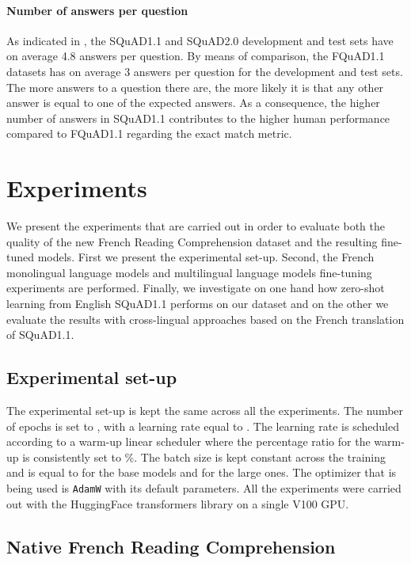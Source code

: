 \documentclass{article}
\begin{document}
\paragraph{Number of answers per question}{
As indicated in \citep{rajpurkar-squad-v2}, the SQuAD1.1 and SQuAD2.0 development and test sets have on average 4.8 answers per question.
By means of comparison, the FQuAD1.1 datasets has on average 3 answers per question for the development and test sets.
The more answers to a question there are, the more likely it is that any other answer is equal to one of the expected answers. 
As a consequence, the higher number of answers in SQuAD1.1 contributes to the higher human performance compared to FQuAD1.1 regarding the exact match metric.
}
 
\section{Experiments}
\label{section:experiments}
We present the experiments that are carried out in order to evaluate both the quality of the new French Reading Comprehension dataset and the resulting fine-tuned models.
First we present the experimental set-up.
Second, the French monolingual language models and multilingual language models fine-tuning experiments are performed.
Finally, we investigate on one hand how zero-shot learning from English SQuAD1.1 performs on our dataset and on the other we evaluate the results with cross-lingual approaches based on the French translation of SQuAD1.1.

\subsection{Experimental set-up}

The experimental set-up is kept the same across all the experiments.
The number of epochs is set to , with a learning rate equal to .
The learning rate is scheduled according to a warm-up linear scheduler where the percentage ratio for the warm-up is consistently set to \%.
The batch size is kept constant across the training and is equal to  for the base models and  for the large ones.
The optimizer that is being used is \texttt{AdamW} with its default parameters.
All the experiments were carried out with the HuggingFace transformers library \citep{Wolf2019HuggingFacesTS} on a single V100 GPU.

\subsection{Native French Reading Comprehension}
\end{document}
